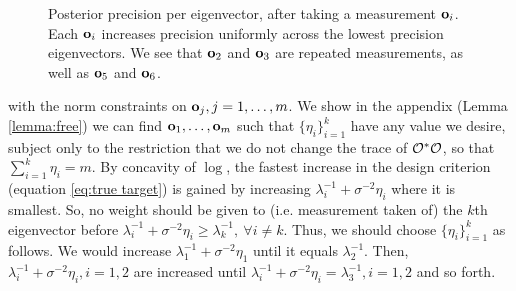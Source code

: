 \documentclass{amsart}
\numberwithin{equation}{section}
\begin{document}
\begin{figure}
  \caption{Posterior precision per eigenvector, after taking a
    measurement $\mathbf{o}_i$. Each $\mathbf{o}_i$ increases precision
    uniformly across the lowest precision eigenvectors. We see that
    $\mathbf{o}_2$ and $\mathbf{o}_3$ are repeated measurements, as well as
    $\mathbf{o}_5$ and $\mathbf{o}_6$.}
  \label{fig:clusterization}
\end{figure}
with the norm constraints on $\mathbf{o}_j,j=1,\dots,m$. We show in the
appendix (Lemma \ref{lemma:free}) we can find $\mathbf{o}_1,\dots,\mathbf{o}_m$
such that $\{\eta_i\}_{i=1}^k$ have any value we desire, subject only
to the restriction that we do not change the trace of $\mathcal{O}^*\mathcal{O}$, so
that $\sum_{i=1}^k \eta_i = m$. By concavity of $\log$, the fastest
increase in the design criterion (equation \eqref{eq:true target}) is
gained by increasing $\lambda_i^{-1} + \sigma^{-2}\eta_i$ where it is
smallest. So, no weight should be given to (i.e. measurement taken of)
the $k$th eigenvector before $\lambda_i^{-1} + \sigma^{-2}\eta_i \geq
\lambda_k^{-1},\ \forall i \neq k$. Thus, we should choose
$\{\eta_i\}_{i=1}^k$ as follows. We would increase $\lambda_1^{-1} +
\sigma^{-2} \eta_1$ until it equals $\lambda_2^{-1}$. Then,
$\lambda_i^{-1} + \sigma^{-2} \eta_i,i=1,2$ are increased until
$\lambda_i^{-1} + \sigma^{-2} \eta_i = \lambda_3^{-1},i=1,2$ and so
forth.
\end{document}
